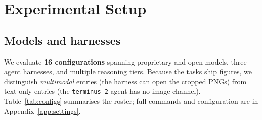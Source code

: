 \section{Experimental Setup}
\label{sec:setup}

\subsection{Models and harnesses}
We evaluate \textbf{16 configurations} spanning proprietary and open models, three agent harnesses, and multiple reasoning tiers. Because the tasks ship figures, we distinguish \emph{multimodal} entries (the harness can open the cropped PNGs) from text-only entries (the \texttt{terminus-2} agent has no image channel). Table~\ref{tab:configs} summarises the roster; full commands and configuration are in Appendix~\ref{app:settings}.

